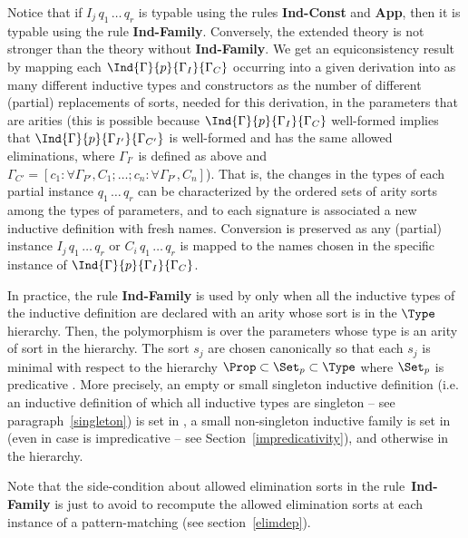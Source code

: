 Notice that if $I_j\,q_1\,\ldots\,q_r$ is typable using the rules {\bf
Ind-Const} and {\bf App}, then it is typable using the rule {\bf
Ind-Family}. Conversely, the extended theory is not stronger than the
theory without {\bf Ind-Family}. We get an equiconsistency result by
mapping each $\Ind{\Gamma}{p}{\Gamma_I}{\Gamma_C}$ occurring into a
given derivation into as many different inductive types and constructors
as the number of different (partial) replacements of sorts, needed for
this derivation, in the parameters that are arities (this is possible
because $\Ind{\Gamma}{p}{\Gamma_I}{\Gamma_C}$ well-formed implies
that $\Ind{\Gamma}{p}{\Gamma_{I'}}{\Gamma_{C'}}$ is well-formed and
has the same allowed eliminations, where
$\Gamma_{I'}$ is defined as above and $\Gamma_{C'} = [c_1:\forall
\Gamma_{P'},C_1;\ldots;c_n:\forall \Gamma_{P'},C_n]$). That is,
the changes in the types of each partial instance
$q_1\,\ldots\,q_r$ can be characterized by the ordered sets of arity
sorts among the types of parameters, and to each signature is
associated a new inductive definition with fresh names. Conversion is
preserved as any (partial) instance $I_j\,q_1\,\ldots\,q_r$ or
$C_i\,q_1\,\ldots\,q_r$ is mapped to the names chosen in the specific
instance of $\Ind{\Gamma}{p}{\Gamma_I}{\Gamma_C}$.

\newcommand{\Single}{\mbox{\textsf{Set}}}

In practice, the rule {\bf Ind-Family} is used by {\Coq} only when all the
inductive types of the inductive definition are declared with an arity whose 
sort is in the $\Type$
hierarchy. Then, the polymorphism is over the parameters whose
type is an arity of sort in the {\Type} hierarchy. 
The sort $s_j$ are
chosen canonically so that each $s_j$ is minimal with respect to the
hierarchy ${\Prop}\subset{\Set_p}\subset\Type$ where $\Set_p$ is
predicative {\Set}.
More precisely, an empty or small singleton inductive definition
(i.e. an inductive definition of which all inductive types are
singleton -- see paragraph~\ref{singleton}) is set in
{\Prop}, a small non-singleton inductive family is set in {\Set} (even
in case {\Set} is impredicative -- see Section~\ref{impredicativity}),
and otherwise in the {\Type} hierarchy.

Note that the side-condition about allowed elimination sorts in the
rule~{\bf Ind-Family} is just to avoid to recompute the allowed
elimination sorts at each instance of a pattern-matching (see
section~\ref{elimdep}).

